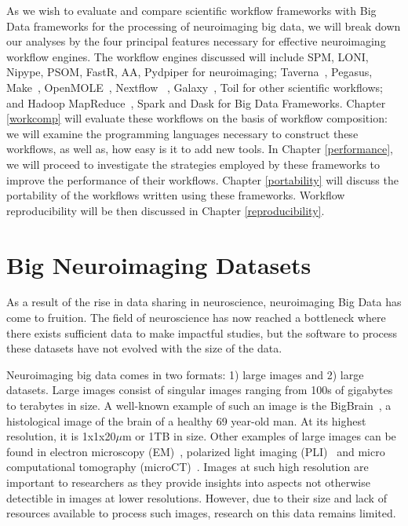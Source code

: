 \documentclass{report}
\begin{document}
        As we wish to evaluate and compare scientific workflow frameworks with
        Big Data frameworks for the processing of neuroimaging big data, we will
        break down our analyses by the four principal features necessary for
        effective neuroimaging workflow engines. The workflow engines discussed
        will include SPM, LONI, Nipype, PSOM, FastR, AA, Pydpiper 
        for neuroimaging; Taverna~\cite{doi:10.1093/bioinformatics/bth361}, 
        Pegasus, Make~\cite{10.3389/fninf.2016.00002}, 
        OpenMOLE~\cite{passerat2014openmole}, Nextflow~\cite{Di-Tommaso:2017aa}
        , Galaxy~\cite{Goecks2010}, 
        Toil for other scientific workflows; and Hadoop 
        MapReduce~\cite{Dean:2008:MSD:1327452.1327492}, Spark and Dask for
        Big Data Frameworks. Chapter \ref{workcomp} will evaluate these 
        workflows on the basis of workflow composition: we will %
        examine the programming languages necessary to construct these workflows,
        as well as, how easy is it to add new tools. In Chapter 
        \ref{performance}, we will proceed to 
        investigate the strategies employed by these frameworks to improve the 
        performance of their workflows. Chapter \ref{portability} will discuss
        the portability of the workflows written using these frameworks. 
        Workflow reproducibility will be then discussed in Chapter 
        \ref{reproducibility}.
        

        \section{Big Neuroimaging Datasets}\label{datasets}

            As a result of the rise in data sharing in neuroscience, 
            neuroimaging
            Big Data has come to fruition. The field of neuroscience has now
            reached a bottleneck where there exists sufficient data to make
            impactful studies, but the software to process these datasets have 
            not evolved with the size of the data.

            Neuroimaging big data comes in two formats: 1) large images and 2) 
            large datasets. Large images consist of singular images ranging 
            from 100s of gigabytes to terabytes in size. A well-known example 
            of 
            such an image is the BigBrain~\cite{Amunts1472}, a histological 
            image 
            of the brain of a healthy 69 year-old man. At its highest resolution,
            it is 1x1x20$\mu$m or 1TB in
            size. Other examples of large images can be found in electron 
            microscopy (EM)~\cite{Hildebrand:2017aa}, polarized light imaging 
            (PLI)~\cite{10.1007/978-3-319-12084-3_1} and micro computational
            tomography (microCT)~\cite{10.1371/journal.pone.0035691}. 
            Images at 
            such high resolution are important to researchers as they provide 
            insights into aspects not otherwise detectible in images at lower 
            resolutions. However, due to their size and lack of resources 
            available to process such images, research on this data remains 
            limited.
\end{document}
